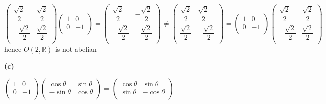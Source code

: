 \documentclass[10pt]{article}
\newcommand{\<}[1]{\langle #1 \rangle}
\begin{document}
$$\left( {\begin{array}{cc}
   \dfrac{\sqrt2}{2} & \dfrac{\sqrt2}{2} \\
   -\dfrac{\sqrt2}{2} & \dfrac{\sqrt2}{2} \\
  \end{array} } \right)\left( {\begin{array}{cc}
   1 & 0 \\
   0 & -1 \\
  \end{array} } \right)=\left( {\begin{array}{cc}
   \dfrac{\sqrt2}{2} & -\dfrac{\sqrt2}{2} \\
   -\dfrac{\sqrt2}{2} & -\dfrac{\sqrt2}{2} \\
  \end{array} } \right)\neq\left( {\begin{array}{cc}
   \dfrac{\sqrt2}{2} & \dfrac{\sqrt2}{2} \\
   \dfrac{\sqrt2}{2} & -\dfrac{\sqrt2}{2} \\
  \end{array} } \right)=\left( {\begin{array}{cc}
   1 & 0 \\
   0 & -1 \\
  \end{array} } \right)\left( {\begin{array}{cc}
   \dfrac{\sqrt2}{2} & \dfrac{\sqrt2}{2} \\
   -\dfrac{\sqrt2}{2} & \dfrac{\sqrt2}{2} \\
  \end{array} } \right)$$
hence $O(2,\mathbb{R})$ is not abelian \par
\textbf{(c)} \par
$\left( {\begin{array}{cc}
   1 & 0 \\
   0 & -1 \\
  \end{array} } \right)\left( {\begin{array}{cc}
   \cos{\theta} & \sin{\theta} \\
   -\sin{\theta} & \cos{\theta} \\
  \end{array} } \right)=\left( {\begin{array}{cc}
   \cos{\theta} & \sin{\theta} \\
   \sin{\theta} & -\cos{\theta} \\
  \end{array} } \right)$
\end{document}
